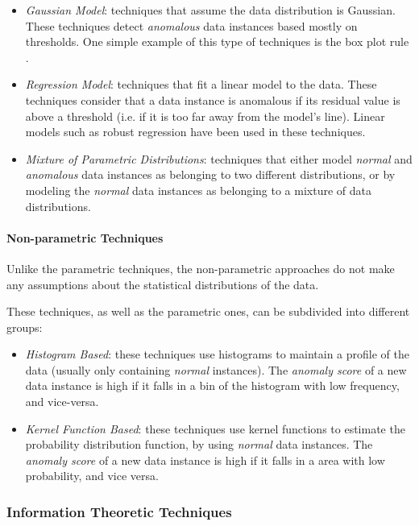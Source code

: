 \begin{itemize}
	\item \textit{Gaussian Model}: techniques that assume the data distribution is Gaussian. These techniques detect \textit{anomalous} data instances based mostly on thresholds. One simple example of this type of techniques is the box plot rule  \cite{laurikkala2000informal}.
	\item \textit{Regression Model}: techniques that fit a linear model to the data. These techniques consider that a data instance is anomalous if its residual value is above a threshold (i.e. if it is too far away from the model's line). Linear models such as robust regression \cite{leroy1987robust} have been used in these techniques.
	\item \textit{Mixture of Parametric Distributions}: techniques that either model \textit{normal} and \textit{anomalous} data instances as belonging to two different distributions, or by modeling the \textit{normal} data instances as belonging to a mixture of data distributions.
\end{itemize}

\paragraph{Non-parametric Techniques}\mbox{}

Unlike the parametric techniques, the non-parametric approaches do not make any assumptions about the statistical distributions of the data.

These techniques, as well as the parametric ones, can be subdivided into different groups:

\begin{itemize}
	\item \textit{Histogram Based}: these techniques use histograms to maintain a profile of the data (usually only containing \textit{normal} instances). The \textit{anomaly score} of a new data instance is high if it falls in a bin of the histogram with low frequency, and vice-versa.
	\item \textit{Kernel Function Based}: these techniques use kernel functions to estimate the probability distribution function, by using \textit{normal} data instances. The \textit{anomaly score} of a new data instance is high if it falls in a area with low probability, and vice versa.
\end{itemize}

\subsubsection{Information Theoretic Techniques}

